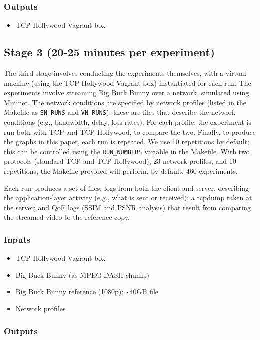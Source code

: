 \documentclass[sigconf]{acmart}
\begin{document}
\subsubsection*{Outputs}
\begin{itemize}
\item TCP Hollywood Vagrant box
\end{itemize}

\subsection*{Stage 3 (20-25 minutes per experiment)}

The third stage involves conducting the experiments themselves, with a virtual machine
(using the TCP Hollywood Vagrant box) instantiated for each run. The experiments involve
streaming Big Buck Bunny over a network, simulated using Mininet. The network conditions are specified
by network profiles (listed in the Makefile as \texttt{SN\_RUNS} and \texttt{VN\_RUNS});
these are files that describe the network conditions (e.g., bandwidth, delay, loss rates).
For each profile, the experiment is run both with TCP and TCP Hollywood, to compare the
two. Finally, to produce the graphs in this paper, each run is repeated. We use 10
repetitions by default; this can be controlled using the \texttt{RUN\_NUMBERS} variable
in the Makefile. With two protocols (standard TCP and TCP Hollywood), 23 network profiles,
and 10 repetitions, the Makefile provided will perform, by default, 460 experiments.

Each run produces a set of files: logs from both the client and server, describing the
application-layer activity (e.g., what is sent or received); a tcpdump taken at the
server; and QoE logs (SSIM and PSNR analysis) that result from comparing the streamed
video to the reference copy.

\subsubsection*{Inputs}
\begin{itemize}
\item TCP Hollywood Vagrant box
\item Big Buck Bunny (as MPEG-DASH chunks)
\item Big Buck Bunny reference (1080p); \textasciitilde40GB file
\item Network profiles
\end{itemize}
\subsubsection*{Outputs}
\end{document}
